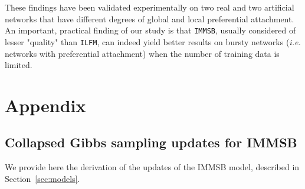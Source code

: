 \documentclass{llncs}
\newcommand{\ifm}{\texttt{ILFM}}
\newcommand{\imb}{\texttt{IMMSB}}
\newcommand{\pr}{P}
\newcommand{\mat}[1]{\mathbf{#1}}
\begin{document}
These findings have been validated experimentally on two real and two artificial networks that have different degrees of global and local preferential attachment. An important, practical finding of our study is that \imb, usually considered of lesser "quality" than \ifm, can indeed yield better results on bursty networks (\textit{i.e.} networks with preferential attachment) when the number of training data is limited.




\appendix
\section{Appendix}
\label{sec:append}
\subsection{Collapsed Gibbs sampling updates for IMMSB}

We provide here the derivation of the updates of the IMMSB model, described in Section~\ref{sec:models}.



\end{document}
